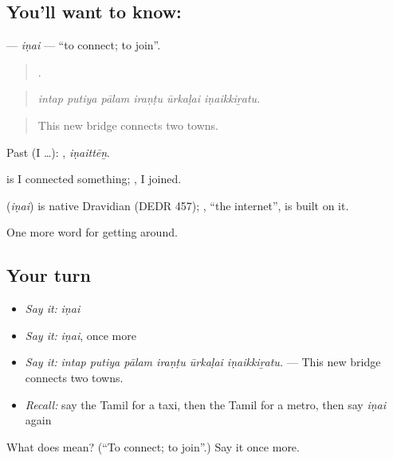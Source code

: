 \subsection*{You'll want to know: }
\textbf{} — \emph{iṇai} — \textquotedblleft{}to connect; to join\textquotedblright{}.

\begin{quote}
     .
\end{quote}

\begin{quote}
\emph{intap putiya pālam iraṇṭu ūrkaḷai iṇaikkiṟatu.}
\end{quote}

\begin{quote}
This new bridge connects two towns.
\end{quote}

Past (I …): , \emph{iṇaittēṉ}.

 is I connected something; , I joined.

\begin{cousinweb}
\textbf{} (\emph{iṇai}) is native Dravidian (DEDR 457); , \textquotedblleft{}the internet\textquotedblright{}, is built on it.
\end{cousinweb}

\begin{grammarlens}[title={What you've built}]
One more word for getting around.
\end{grammarlens}

\subsection*{Your turn}
\begin{itemize}
\raggedright
  \item \emph{Say it:} \emph{iṇai}
  \item \emph{Say it:} \emph{iṇai}, once more
  \item \emph{Say it:} \emph{intap putiya pālam iraṇṭu ūrkaḷai iṇaikkiṟatu.} — This new bridge connects two towns.
  \item \emph{Recall:} say the Tamil for a taxi, then the Tamil for a metro, then say \emph{iṇai} again
\end{itemize}

\begin{tcolorbox}[breakable,colback=teal!4,colframe=teal!35!black,title={Before you move on}]
What does  mean? (\textquotedblleft{}To connect; to join\textquotedblright{}.) Say it once more.
\end{tcolorbox}

